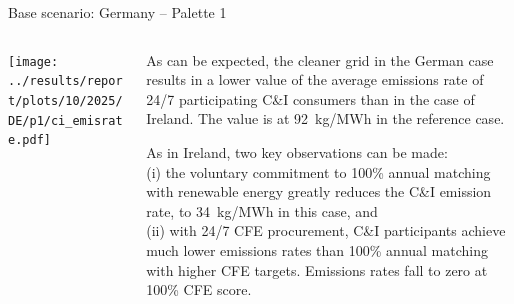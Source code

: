   
  
  \begin{frame}{Base scenario: Germany -- Palette 1}
  
  {\footnotesize
  \vspace{0.3cm}
  
  \begin{columns}[T]
  \begin{column}{9cm}
  \centering
  
  \texttt{[image: ../results/report/plots/10/2025/DE/p1/ci\_emisrate.pdf]}
  
  \end{column}
  \begin{column}{6cm}
  
  \vspace{0.1cm}
  As can be expected, the cleaner grid in the German case results in 
  a lower value of the average emissions rate of 24/7 participating 
  C\&I consumers than in the case of Ireland. The value is at 92~kg/MWh 
  in the reference case.
  
  \vspace{0.3cm}
  As in Ireland, \alert{two key observations} can be made: \\ 

  \vspace{0.1cm}
  (i) the voluntary commitment to 100\% annual matching 
  with renewable energy greatly reduces the C\&I emission rate, to 34~kg/MWh
  in this case, and \\
  \vspace{0.1cm}
  (ii) with 24/7 CFE procurement, C\&I participants achieve much lower emissions 
  rates than 100\% annual matching with higher CFE targets. Emissions rates 
  fall to zero at 100\% CFE score.

  \end{column}
  \end{columns}
  }
  \end{frame}
  


